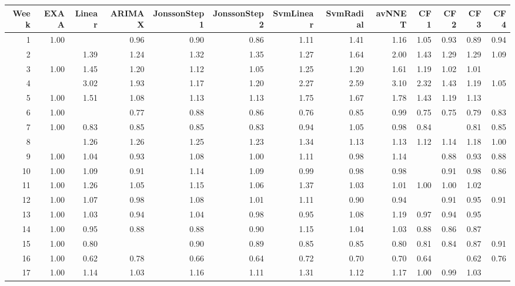 \begin{tabular}{rrrrrrrrrrrrr}
  \hline
Week & EXAA & Linear & ARIMAX & JonssonStep1 & JonssonStep2 & SvmLinear & SvmRadial & avNNET & CF1 & CF2 & CF3 & CF4 \\ 
  \hline
1 & 1.00 & \color{blue}{0.83} & 0.96 & 0.90 & 0.86 & 1.11 & 1.41 & 1.16 & 1.05 & 0.93 & 0.89 & 0.94 \\ 
  2 & \color{blue}{1.00} & 1.39 & 1.24 & 1.32 & 1.35 & 1.27 & 1.64 & 2.00 & 1.43 & 1.29 & 1.29 & 1.09 \\ 
  3 & 1.00 & 1.45 & 1.20 & 1.12 & 1.05 & 1.25 & 1.20 & 1.61 & 1.19 & 1.02 & 1.01 & \color{blue}{0.94} \\ 
  4 & \color{blue}{1.00} & 3.02 & 1.93 & 1.17 & 1.20 & 2.27 & 2.59 & 3.10 & 2.32 & 1.43 & 1.19 & 1.05 \\ 
  5 & 1.00 & 1.51 & 1.08 & 1.13 & 1.13 & 1.75 & 1.67 & 1.78 & 1.43 & 1.19 & 1.13 & \color{blue}{0.93} \\ 
  6 & 1.00 & \color{blue}{0.73} & 0.77 & 0.88 & 0.86 & 0.76 & 0.85 & 0.99 & 0.75 & 0.75 & 0.79 & 0.83 \\ 
  7 & 1.00 & 0.83 & 0.85 & 0.85 & 0.83 & 0.94 & 1.05 & 0.98 & 0.84 & \color{blue}{0.80} & 0.81 & 0.85 \\ 
  8 & \color{blue}{1.00} & 1.26 & 1.26 & 1.25 & 1.23 & 1.34 & 1.13 & 1.13 & 1.12 & 1.14 & 1.18 & 1.00 \\ 
  9 & 1.00 & 1.04 & 0.93 & 1.08 & 1.00 & 1.11 & 0.98 & 1.14 & \color{blue}{0.87} & 0.88 & 0.93 & 0.88 \\ 
  10 & 1.00 & 1.09 & 0.91 & 1.14 & 1.09 & 0.99 & 0.98 & 0.98 & \color{blue}{0.85} & 0.91 & 0.98 & 0.86 \\ 
  11 & 1.00 & 1.26 & 1.05 & 1.15 & 1.06 & 1.37 & 1.03 & 1.01 & 1.00 & 1.00 & 1.02 & \color{blue}{0.92} \\ 
  12 & 1.00 & 1.07 & 0.98 & 1.08 & 1.01 & 1.11 & 0.90 & 0.94 & \color{blue}{0.88} & 0.91 & 0.95 & 0.91 \\ 
  13 & 1.00 & 1.03 & 0.94 & 1.04 & 0.98 & 0.95 & 1.08 & 1.19 & 0.97 & 0.94 & 0.95 & \color{blue}{0.91} \\ 
  14 & 1.00 & 0.95 & 0.88 & 0.88 & 0.90 & 1.15 & 1.04 & 1.03 & 0.88 & 0.86 & 0.87 & \color{blue}{0.85} \\ 
  15 & 1.00 & 0.80 & \color{blue}{0.78} & 0.90 & 0.89 & 0.85 & 0.85 & 0.80 & 0.81 & 0.84 & 0.87 & 0.91 \\ 
  16 & 1.00 & 0.62 & 0.78 & 0.66 & 0.64 & 0.72 & 0.70 & 0.70 & 0.64 & \color{blue}{0.61} & 0.62 & 0.76 \\ 
  17 & 1.00 & 1.14 & 1.03 & 1.16 & 1.11 & 1.31 & 1.12 & 1.17 & 1.00 & 0.99 & 1.03 & \color{blue}{0.87} \\ 

\end{tabular}
